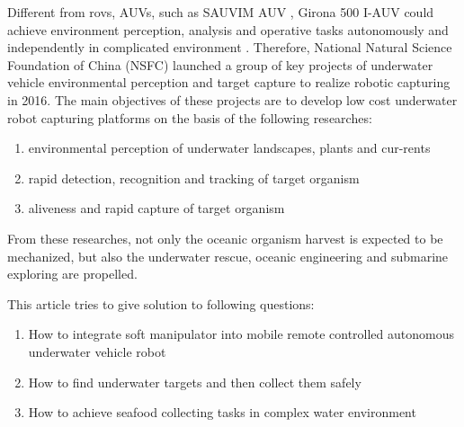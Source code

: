 Different from \gls{rov}s, \gls{AUV}s, such as SAUVIM AUV
\parencite{marani2014introduction}, Girona 500 I-AUV \parencite{ribas2015auv}
could achieve environment perception, analysis and operative tasks autonomously
and independently in complicated environment \parencite{barbualatua2014dynamic}.
Therefore, National Natural Science Foundation of  China (NSFC) launched a group
of key projects of underwater vehicle environmental perception and target
capture to realize robotic capturing in 2016. The main objectives of these
projects are to develop low cost underwater robot capturing platforms on the
basis of the following researches:
\begin{enumerate}
    \item environmental perception of  underwater landscapes, plants and
    cur-rents
    \item rapid detection, recognition and tracking of target organism
    \item aliveness and rapid capture of target organism
\end{enumerate}

From these researches, not only the oceanic organism harvest is expected to be
mechanized, but also the underwater rescue, oceanic engineering and submarine
exploring are propelled.

This article tries to give solution to following questions:

\begin{enumerate}
    \item How to integrate soft manipulator into mobile remote controlled
    autonomous underwater vehicle robot
    \item How to find underwater targets and then collect them safely
    \item How to achieve seafood collecting tasks in complex water environment
\end{enumerate}




